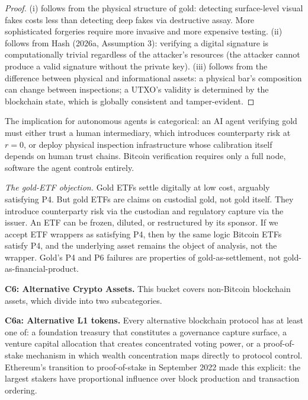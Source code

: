 \documentclass[12pt]{article}
\theoremstyle{definition}
\theoremstyle{remark}
\begin{document}
\begin{proof}
(i) follows from the physical structure of gold: detecting surface-level
visual fakes costs less than detecting deep fakes via destructive
assay. More sophisticated forgeries require more invasive and more
expensive testing. (ii) follows from Hash (2026a, Assumption 3): verifying a digital
signature
is computationally trivial regardless of the attacker's resources (the
attacker cannot produce a valid signature without the private key).
(iii) follows from the difference between physical and informational
assets: a physical bar's composition can change between inspections; a
UTXO's validity is determined by the blockchain state, which is globally
consistent and tamper-evident.
\end{proof}

The implication for autonomous agents is categorical: an AI agent
verifying gold must either trust a human intermediary, which introduces
counterparty risk at $r = 0$, or deploy physical inspection
infrastructure whose calibration itself depends on human trust chains.
Bitcoin verification requires only a full node, software the agent
controls entirely.

\noindent\emph{The gold-ETF objection.} Gold ETFs settle digitally at low
cost, arguably satisfying P4. But gold ETFs are claims on custodial
gold, not gold itself. They introduce counterparty risk via the
custodian and regulatory capture via the issuer. An ETF can be frozen,
diluted, or restructured by its sponsor. If we accept ETF wrappers as
satisfying P4, then by the same logic Bitcoin ETFs satisfy P4, and the
underlying asset remains the object of analysis, not the wrapper.
Gold's P4 and P6 failures are properties of gold-as-settlement, not
gold-as-financial-product.

\noindent\textbf{C6: Alternative Crypto Assets.} This bucket covers
non-Bitcoin blockchain assets, which divide into two subcategories.

\noindent\textbf{C6a: Alternative L1 tokens.} Every alternative
blockchain protocol has at least one of: a foundation treasury that
constitutes a governance capture surface, a venture capital allocation
that creates concentrated voting power, or a proof-of-stake mechanism
in which wealth concentration maps directly to protocol control.
Ethereum's transition to proof-of-stake in September 2022 made this
explicit: the largest stakers have proportional influence over block
production and transaction ordering.
\end{document}
